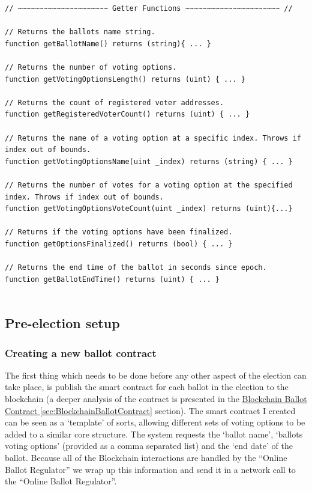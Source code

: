 \documentclass{article}
\begin{document}
\begin{lstlisting}[caption=Summary of getter functions.]
// ~~~~~~~~~~~~~~~~~~~~~ Getter Functions ~~~~~~~~~~~~~~~~~~~~~~ //

// Returns the ballots name string.
function getBallotName() returns (string){ ... }

// Returns the number of voting options.
function getVotingOptionsLength() returns (uint) { ... }

// Returns the count of registered voter addresses.
function getRegisteredVoterCount() returns (uint) { ... }

// Returns the name of a voting option at a specific index. Throws if index out of bounds.
function getVotingOptionsName(uint _index) returns (string) { ... }

// Returns the number of votes for a voting option at the specified index. Throws if index out of bounds.
function getVotingOptionsVoteCount(uint _index) returns (uint){...}

// Returns if the voting options have been finalized.
function getOptionsFinalized() returns (bool) { ... }

// Returns the end time of the ballot in seconds since epoch.
function getBallotEndTime() returns (uint) { ... }
    
\end{lstlisting}



\clearpage
\subsection{Pre-election setup}
\subsubsection{Creating a new ballot contract}
\label{sec:CreatingANewBallotContract}
The first thing which needs to be done before any other aspect of the election can take place, is publish the smart contract for each ballot in the election to the blockchain (a deeper analysis of the contract is presented in the \hyperref[sec:BlockchainBallotContract]{Blockchain Ballot Contract \ref*{sec:BlockchainBallotContract}} section). The smart contract I created can be seen as a `template' of sorts, allowing different sets of voting options to be added to a similar core structure. The system requests the `ballot name', `ballots voting options' (provided as a comma separated list) and the `end date' of the ballot. Because all of the Blockchain interactions are handled by the ``Online Ballot Regulator'' we wrap up this information and send it in a network call to the ``Online Ballot Regulator''.
\end{document}
